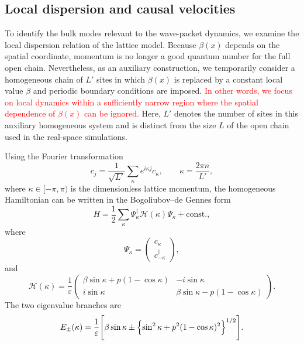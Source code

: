 \documentclass[reprint,amsmath,amssymb,aps,prb,showkeys,superscriptaddress]{revtex4-2}
\newcommand{\red}{\textcolor{red}}
\begin{document}
\subsection{Local dispersion and causal velocities}
\label{subsec:dispersion}

To identify the bulk modes relevant to the wave-packet dynamics, we
examine the local dispersion relation of the lattice model. Because 
$\beta(x)$ depends on the spatial coordinate, momentum is no longer a good quantum number for
the full open chain. Nevertheless, as an auxiliary construction, we temporarily consider a homogeneous
chain of $L'$ sites in which $\beta(x)$ is replaced by a constant
local value $\beta$ and periodic boundary conditions are imposed.
\red{In other words, we focus on local dynamics within a sufficiently narrow region where the spatial dependence of $\beta(x)$ can be ignored. }
Here, $L'$ denotes the number of sites in this auxiliary homogeneous
system and is distinct from the size $L$ of the open chain used in
the real-space simulations.

Using the Fourier transformation
\begin{equation}
  c_j
  =
  \frac{1}{\sqrt{L'}}
  \sum_{\kappa}
  e^{i\kappa j}c_{\kappa},
  \qquad
  \kappa=\frac{2\pi n}{L'},
  \label{eq:Fourier_transform}
\end{equation}
where $\kappa\in[-\pi,\pi)$ is the dimensionless lattice momentum,
the homogeneous Hamiltonian can be written in the
Bogoliubov--de Gennes form
\begin{equation}
  H
  =
  \frac{1}{2}
  \sum_{\kappa}
  \Psi_{\kappa}^{\dagger}
  \mathcal{H}(\kappa)
  \Psi_{\kappa}
  +\mathrm{const.},
  \label{eq:BdG_Hamiltonian}
\end{equation}
where
\begin{equation}
  \Psi_{\kappa}
  =
  \begin{pmatrix}
    c_{\kappa}\\
    c_{-\kappa}^{\dagger}
  \end{pmatrix},
  \label{eq:Nambu_spinor}
\end{equation}
and
\begin{equation}
  \mathcal{H}(\kappa)
  =
  \frac{1}{\varepsilon}
  \begin{pmatrix}
    \beta\sin\kappa
    +p(1-\cos\kappa)
      & -i\sin\kappa
    \\
    i\sin\kappa
      & \beta\sin\kappa
        -p(1-\cos\kappa)
  \end{pmatrix}.
  \label{eq:BdG_matrix}
\end{equation}
The two eigenvalue branches are
\begin{equation}
\begin{aligned}
  E_{\pm}(\kappa)
  =
  \frac{1}{\varepsilon}
  \Biggl[
    \beta\sin\kappa
    \mathbin{\pm}
    \Bigl\{
      \sin^{2}\kappa
      +p^{2}(1-\cos\kappa)^{2}
    \Bigr\}^{1/2}
  \Biggr].
\end{aligned}
  \label{eq:lattice_dispersion}
\end{equation}
\end{document}
